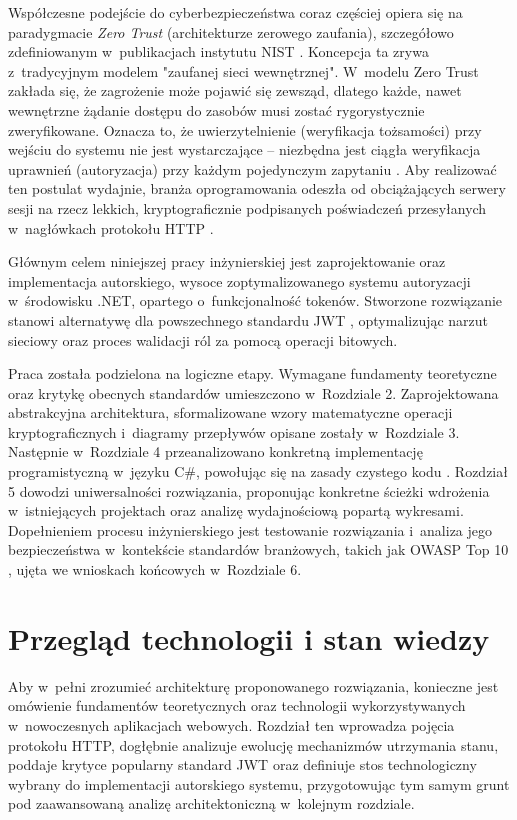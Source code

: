 \documentclass{SGGW-thesis}
\begin{document}
Współczesne podejście do cyberbezpieczeństwa coraz częściej opiera się na paradygmacie \textit{Zero Trust} (architekturze zerowego zaufania), szczegółowo zdefiniowanym w~publikacjach instytutu NIST \cite{nist_zt}. Koncepcja ta zrywa z~tradycyjnym modelem "zaufanej sieci wewnętrznej". W~modelu Zero Trust zakłada się, że zagrożenie może pojawić się zewsząd, dlatego każde, nawet wewnętrzne żądanie dostępu do zasobów musi zostać rygorystycznie zweryfikowane. Oznacza to, że uwierzytelnienie (weryfikacja tożsamości) przy wejściu do systemu nie jest wystarczające – niezbędna jest ciągła weryfikacja uprawnień (autoryzacja) przy każdym pojedynczym zapytaniu \cite{proaspnet}. Aby realizować ten postulat wydajnie, branża oprogramowania odeszła od obciążających serwery sesji na rzecz lekkich, kryptograficznie podpisanych poświadczeń przesyłanych w~nagłówkach protokołu HTTP \cite{fielding2000}.

Głównym celem niniejszej pracy inżynierskiej jest zaprojektowanie oraz implementacja autorskiego, wysoce zoptymalizowanego systemu autoryzacji w~środowisku .NET, opartego o~funkcjonalność tokenów. Stworzone rozwiązanie stanowi alternatywę dla powszechnego standardu JWT \cite{rfc7519}, optymalizując narzut sieciowy oraz proces walidacji ról za pomocą operacji bitowych. 

Praca została podzielona na logiczne etapy. Wymagane fundamenty teoretyczne oraz krytykę obecnych standardów umieszczono w~Rozdziale 2. Zaprojektowana abstrakcyjna architektura, sformalizowane wzory matematyczne operacji kryptograficznych i~diagramy przepływów opisane zostały w~Rozdziale 3. Następnie w~Rozdziale 4 przeanalizowano konkretną implementację programistyczną w~języku C\#, powołując się na zasady czystego kodu \cite{cleancode}. Rozdział 5 dowodzi uniwersalności rozwiązania, proponując konkretne ścieżki wdrożenia w~istniejących projektach oraz analizę wydajnościową popartą wykresami. Dopełnieniem procesu inżynierskiego jest testowanie rozwiązania i~analiza jego bezpieczeństwa w~kontekście standardów branżowych, takich jak OWASP Top 10 \cite{owasp2021}, ujęta we wnioskach końcowych w~Rozdziale 6.

\startchapterfromoddpage
\chapter{Przegląd technologii i stan wiedzy}

Aby w~pełni zrozumieć architekturę proponowanego rozwiązania, konieczne jest omówienie fundamentów teoretycznych oraz technologii wykorzystywanych w~nowoczesnych aplikacjach webowych. Rozdział ten wprowadza pojęcia protokołu HTTP, dogłębnie analizuje ewolucję mechanizmów utrzymania stanu, poddaje krytyce popularny standard JWT oraz definiuje stos technologiczny wybrany do implementacji autorskiego systemu, przygotowując tym samym grunt pod zaawansowaną analizę architektoniczną w~kolejnym rozdziale.
\end{document}
